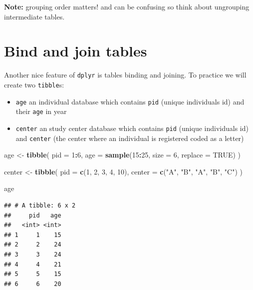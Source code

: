 \documentclass[
]{book}
\newenvironment{Shaded}{\begin{snugshade}}{\end{snugshade}}
\newcommand{\AttributeTok}[1]{\textcolor[rgb]{0.13,0.29,0.53}{#1}}
\newcommand{\ConstantTok}[1]{\textcolor[rgb]{0.56,0.35,0.01}{#1}}
\newcommand{\DecValTok}[1]{\textcolor[rgb]{0.00,0.00,0.81}{#1}}
\newcommand{\FunctionTok}[1]{\textcolor[rgb]{0.13,0.29,0.53}{\textbf{#1}}}
\newcommand{\NormalTok}[1]{#1}
\newcommand{\OtherTok}[1]{\textcolor[rgb]{0.56,0.35,0.01}{#1}}
\newcommand{\SpecialCharTok}[1]{\textcolor[rgb]{0.81,0.36,0.00}{\textbf{#1}}}
\newcommand{\StringTok}[1]{\textcolor[rgb]{0.31,0.60,0.02}{#1}}
\providecommand{\tightlist}{%
  \setlength{\itemsep}{0pt}\setlength{\parskip}{0pt}}
\begin{document}
\textbf{Note:} grouping order matters! and can be confusing so think about ungrouping intermediate tables.

\section{Bind and join tables}\label{bind-and-join-tables}

Another nice feature of \texttt{dplyr} is tables binding and joining. To practice we will create two \texttt{tibble}s:

\begin{itemize}
\tightlist
\item
  \texttt{age} an individual database which contains \texttt{pid} (unique individuals id)
  and their \texttt{age} in year
\item
  \texttt{center} an study center database which contains \texttt{pid} (unique individuals id)
  and \texttt{center} (the center where an individual is registered coded as a letter)
\end{itemize}

\begin{Shaded}
\begin{Highlighting}[]
\NormalTok{age }\OtherTok{\textless{}{-}}
  \FunctionTok{tibble}\NormalTok{(}
    \AttributeTok{pid =} \DecValTok{1}\SpecialCharTok{:}\DecValTok{6}\NormalTok{,}
    \AttributeTok{age =} \FunctionTok{sample}\NormalTok{(}\DecValTok{15}\SpecialCharTok{:}\DecValTok{25}\NormalTok{, }\AttributeTok{size =} \DecValTok{6}\NormalTok{, }\AttributeTok{replace =} \ConstantTok{TRUE}\NormalTok{)}
\NormalTok{  )}

\NormalTok{center }\OtherTok{\textless{}{-}}
  \FunctionTok{tibble}\NormalTok{(}
    \AttributeTok{pid =} \FunctionTok{c}\NormalTok{(}\DecValTok{1}\NormalTok{, }\DecValTok{2}\NormalTok{, }\DecValTok{3}\NormalTok{, }\DecValTok{4}\NormalTok{, }\DecValTok{10}\NormalTok{),}
    \AttributeTok{center =} \FunctionTok{c}\NormalTok{(}\StringTok{"A"}\NormalTok{, }\StringTok{"B"}\NormalTok{, }\StringTok{"A"}\NormalTok{, }\StringTok{"B"}\NormalTok{, }\StringTok{"C"}\NormalTok{)}
\NormalTok{  )}

\NormalTok{age}
\end{Highlighting}
\end{Shaded}

\begin{verbatim}
## # A tibble: 6 x 2
##     pid   age
##   <int> <int>
## 1     1    15
## 2     2    24
## 3     3    24
## 4     4    21
## 5     5    15
## 6     6    20
\end{verbatim}
\end{document}

